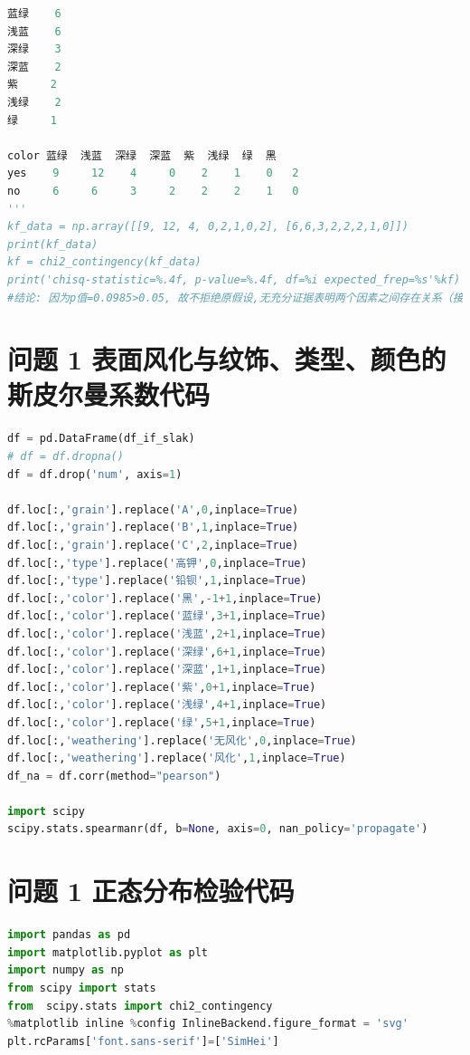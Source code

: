 \documentclass[withoutpreface,bwprint]{cumcmthesis} %
\begin{document}
\begin{appendices}
\begin{lstlisting}[language=Python]
蓝绿    6
浅蓝    6
深绿    3
深蓝    2
紫     2
浅绿    2
绿     1

color 蓝绿  浅蓝  深绿  深蓝  紫  浅绿  绿  黑
yes    9     12    4     0    2    1    0   2
no     6     6     3     2    2    2    1   0
'''
kf_data = np.array([[9, 12, 4, 0,2,1,0,2], [6,6,3,2,2,2,1,0]])
print(kf_data)
kf = chi2_contingency(kf_data)
print('chisq-statistic=%.4f, p-value=%.4f, df=%i expected_frep=%s'%kf)
#结论: 因为p值=0.0985>0.05, 故不拒绝原假设,无充分证据表明两个因素之间存在关系（接受原假设, 认为玻璃纹饰和是否风化无显著差别。）
\end{lstlisting}

\section{问题 1 表面风化与纹饰、类型、颜色的斯皮尔曼系数代码}
\begin{lstlisting}[language=Python]
df = pd.DataFrame(df_if_slak)
# df = df.dropna()
df = df.drop('num', axis=1)

df.loc[:,'grain'].replace('A',0,inplace=True)
df.loc[:,'grain'].replace('B',1,inplace=True)
df.loc[:,'grain'].replace('C',2,inplace=True)
df.loc[:,'type'].replace('高钾',0,inplace=True)
df.loc[:,'type'].replace('铅钡',1,inplace=True)
df.loc[:,'color'].replace('黑',-1+1,inplace=True)
df.loc[:,'color'].replace('蓝绿',3+1,inplace=True)
df.loc[:,'color'].replace('浅蓝',2+1,inplace=True)
df.loc[:,'color'].replace('深绿',6+1,inplace=True)
df.loc[:,'color'].replace('深蓝',1+1,inplace=True)
df.loc[:,'color'].replace('紫',0+1,inplace=True)
df.loc[:,'color'].replace('浅绿',4+1,inplace=True)
df.loc[:,'color'].replace('绿',5+1,inplace=True)
df.loc[:,'weathering'].replace('无风化',0,inplace=True)
df.loc[:,'weathering'].replace('风化',1,inplace=True)
df_na = df.corr(method="pearson")

import scipy
scipy.stats.spearmanr(df, b=None, axis=0, nan_policy='propagate')
\end{lstlisting}

\section{问题 1 正态分布检验代码}
\begin{lstlisting}[language=Python]
import pandas as pd 
import matplotlib.pyplot as plt
import numpy as np
from scipy import stats
from  scipy.stats import chi2_contingency
%matplotlib inline %config InlineBackend.figure_format = 'svg'
plt.rcParams['font.sans-serif']=['SimHei']


\end{lstlisting}
\end{appendices}
\end{document}
